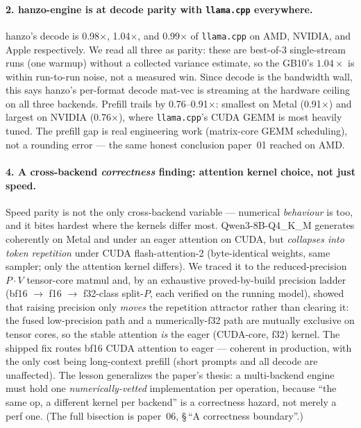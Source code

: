 \documentclass[11pt]{article}
\begin{document}
\paragraph{2. hanzo-engine is at decode parity with \texttt{llama.cpp} everywhere.}
hanzo's decode is 0.98$\times$, 1.04$\times$, and 0.99$\times$ of \texttt{llama.cpp} on AMD,
NVIDIA, and Apple respectively. We read all three as parity: these are best-of-3 single-stream
runs (one warmup) without a collected variance estimate, so the GB10's $1.04\times$ is within
run-to-run noise, not a measured win.
Since decode is the bandwidth wall, this says hanzo's per-format decode mat-vec is streaming at
the hardware ceiling on all three backends. Prefill trails by 0.76--0.91$\times$: smallest on
Metal (0.91$\times$) and largest on NVIDIA (0.76$\times$), where \texttt{llama.cpp}'s CUDA GEMM
is most heavily tuned. The prefill gap is real engineering work (matrix-core GEMM scheduling),
not a rounding error --- the same honest conclusion paper~01 reached on AMD.

\paragraph{4. A cross-backend \emph{correctness} finding: attention kernel choice, not just speed.}
Speed parity is not the only cross-backend variable --- numerical \emph{behaviour} is too, and it
bites hardest where the kernels differ most. Qwen3-8B-Q4\_K\_M generates coherently on Metal and
under an eager attention on CUDA, but \emph{collapses into token repetition} under CUDA
flash-attention-2 (byte-identical weights, same sampler; only the attention kernel differs). We
traced it to the reduced-precision $P\!\cdot\!V$ tensor-core matmul and, by an exhaustive
proved-by-build precision ladder (bf16 $\to$ f16 $\to$ f32-class split-$P$, each verified on the
running model), showed that raising precision only \emph{moves} the repetition attractor rather than
clearing it: the fused low-precision path and a numerically-f32 path are mutually exclusive on tensor
cores, so the stable attention \emph{is} the eager (CUDA-core, f32) kernel. The shipped fix routes
bf16 CUDA attention to eager --- coherent in production, with the only cost being long-context
prefill (short prompts and all decode are unaffected). The lesson generalizes the paper's thesis:
a multi-backend engine must hold one \emph{numerically-vetted} implementation per operation, because
``the same op, a different kernel per backend'' is a correctness hazard, not merely a perf one. (The
full bisection is paper~06, \S\,``A correctness boundary''.)
\end{document}
